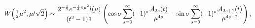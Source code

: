 \[\mathop{W\/}\nolimits\!\left(\tfrac{1}{2}\mu^{2},\mu t\sqrt{2}\right)\sim\frac%
{2^{-\frac{1}{2}}e^{-\frac{1}{4}\pi\mu^{2}}l(\mu)}{(t^{2}-1)^{\frac{1}{4}}}%
\left(\mathop{\cos\/}\nolimits\sigma\sum_{s=0}^{\infty}(-1)^{s}\frac{{\cal{A}}%
_{2s}(t)}{\mu^{4s}}-\mathop{\sin\/}\nolimits\sigma\sum_{s=0}^{\infty}(-1)^{s}%
\frac{{\cal{A}}_{2s+1}(t)}{\mu^{4s+2}}\right),\]